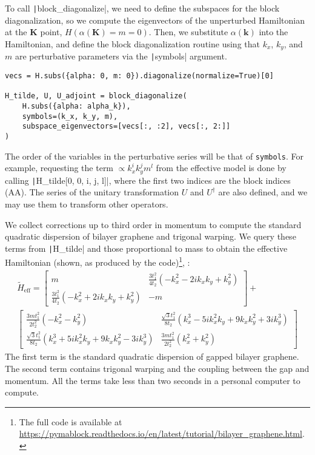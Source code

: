 To call \texttt|block_diagonalize|, we need to define the subspaces
for the block diagonalization, so we compute the eigenvectors of the
unperturbed Hamiltonian at the $\mathbf{K}$ point, $H(\alpha(\mathbf{K}) = m =
0)$.
Then, we substitute $\alpha(\mathbf{k})$ into the Hamiltonian, and define the
block diagonalization routine using that $k_x$, $k_y$, and $m$ are perturbative
parameters via the \texttt|symbols| argument.
%
\begin{verbatim}
vecs = H.subs({alpha: 0, m: 0}).diagonalize(normalize=True)[0]

H_tilde, U, U_adjoint = block_diagonalize(
    H.subs({alpha: alpha_k}),
    symbols=(k_x, k_y, m),
    subspace_eigenvectors=[vecs[:, :2], vecs[:, 2:]]
)
\end{verbatim}
%
The order of the variables in the perturbative series will be that of
\texttt{symbols}.
For example, requesting the term $\propto k_x^{i} k_y^{j} m^{l}$ from the
effective model is done by calling \texttt|H_tilde[0, 0, i, j, l]|,
where the first two indices are the block indices (AA).
The series of the unitary transformation $U$ and $U^\dagger$ are also defined,
and we may use them to transform other operators.

We collect corrections up to third order in momentum to compute the standard
quadratic dispersion of bilayer graphene and trigonal warping.
We query these terms from \texttt|H_tilde| and those proportional
to mass to obtain the effective Hamiltonian (shown, as produced by the
code)\footnote{The full code is available at
\url{https://pymablock.readthedocs.io/en/latest/tutorial/bilayer_graphene.html}.},
:
%
{\small
\begin{gather}
\tilde{H}_{\textrm{eff}} =
\begin{bmatrix}
m & \frac{3 t_1^2}{4 t_2} ( - k_x^2 - 2ik_x k_y + k_y^2) \\
\frac{3 t_1^2}{4 t_2} ( - k_x^2 + 2ik_x k_y + k_y^2) & -m
\end{bmatrix} + \nonumber \\
\begin{bmatrix}
\frac{3 m t_1^2}{2 t_2^2} ( - k_x^2 - k_y^2) & \frac{\sqrt{3} t_1^2}{8 t_2} (k_x^3 - 5ik_x^2 k_y + 9 k_x k_y^2 + 3ik_y^3) \\
\frac{\sqrt{3} t_1^2}{8 t_2} (k_x^3 + 5ik_x^2 k_y + 9 k_x k_y^2 - 3ik_y^3) & \frac{3 m t_1^2}{2 t_2^2} (k_x^2 + k_y^2)
\end{bmatrix} \nonumber
\end{gather}
}
%
The first term is the standard quadratic dispersion of gapped bilayer
graphene.
The second term contains trigonal warping and the coupling between the gap and
momentum.
All the terms take less than two seconds in a personal computer to compute.


